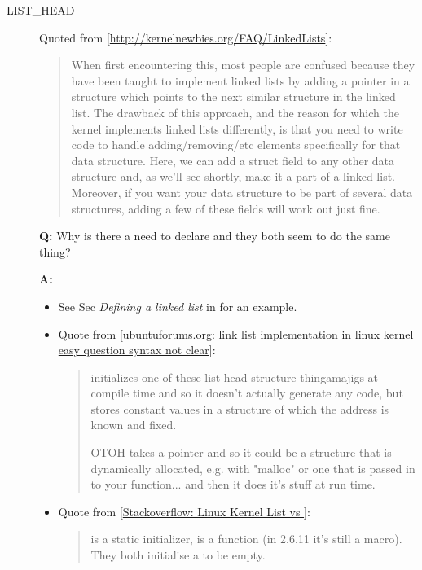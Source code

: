 \begin{description}
\item[LIST\_HEAD] Quoted from [\url{http://kernelnewbies.org/FAQ/LinkedLists}]:
  \begin{quote}
    When first encountering this, most people are confused because they have been taught
    to implement linked lists by adding a pointer in a structure which points to the next
    similar structure in the linked list. The drawback of this approach, and the reason
    for which the kernel implements linked lists differently, is that you need to write
    code to handle adding/removing/etc elements specifically for that data
    structure. Here, we can add a struct  field to any other data
    structure and, as we'll see shortly, make it a part of a linked list. Moreover, if you
    want your data structure to be part of several data structures, adding a few of these
    fields will work out just fine.
  \end{quote}

  \textbf{Q:} Why is there a need to declare  and
   they both seem to do the same thing?

  \textbf{A:}
  \begin{itemize}
  \item See Sec \emph{Defining a linked list} in \cite{love2010linux} for an example.
  \item Quote from
    [\href{http://ubuntuforums.org/archive/index.php/t-1591281.html}{ubuntuforums.org:
      link list implementation in linux kernel easy question syntax not clear}]:
    \begin{quote}
       initializes one of these list head structure thingamajigs at
      compile time and so it doesn't actually generate any code, but stores constant
      values in a structure of which the address is known and fixed.

      OTOH  takes a pointer and so it could be a structure that is
      dynamically allocated, e.g. with "malloc" or one that is passed in to your
      function... and then it does it's stuff at run time.
    \end{quote}
  \item Quote from
    [\href{http://stackoverflow.com/questions/10262017/linux-kernel-list-list-head-init-vs-init-list-head}{Stackoverflow:
      Linux Kernel List  vs }]:
    \begin{quote}
       is a static initializer,  is a
      function (in 2.6.11 it's still a macro). They both initialise a  to
      be empty.


\end{quote}
\end{itemize}
\end{description}
